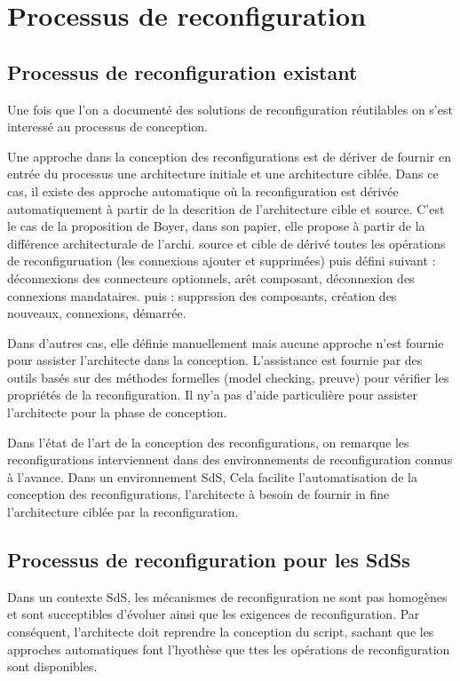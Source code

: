 \section{Processus de reconfiguration}

\subsection{Processus de reconfiguration existant}

Une fois que l'on a documenté des solutions de reconfiguration
réutilables on s'est interessé au processus de conception.

Une approche dans la conception des reconfigurations est de
dériver de fournir en entrée du processus une architecture initiale et
une architecture ciblée. Dans ce cas, il existe des approche
automatique où la reconfiguration est dérivée automatiquement à partir de la
descrition de l'architecture cible et source. C'est le cas de la
proposition de Boyer, dans son papier, elle propose à partir de la
différence architecturale de l'archi. source et cible de dérivé toutes
les opérations de reconfiguruation (les connexions ajouter et
supprimées) puis défini suivant : déconnexions des connecteurs
optionnels, arêt composant, déconnexion des connexions mandataires.
puis : supprssion des composants, création des nouveaux, connexions,
démarrée.   

Dans d'autres cas, elle
définie manuellement mais aucune approche n'est fournie pour assister
l'architecte dans la conception. L'assistance est fournie par des
outils basés sur des méthodes formelles (model checking, preuve) pour
vérifier les propriétés de la reconfiguration. Il ny'a pas d'aide
particulière pour assister l'architecte pour la phase de conception. 

Dans l'état de l'art de la conception des reconfigurations, on
remarque les reconfigurations interviennent dans des environnements de
reconfiguration connus à l'avance. Dans un environnement SdS,  
Cela facilite l'automatisation de la conception des reconfigurations,
l'architecte à besoin de fournir in fine l'architecture ciblée par la
reconfiguration.


\subsection{Processus de reconfiguration pour les SdSs}

Dans un contexte SdS, les mécanismes de reconfiguration ne sont pas
homogènes et sont succeptibles d'évoluer ainsi que les exigences de
reconfiguration. Par conséquent, l'architecte doit reprendre la
conception du script, sachant que les approches automatiques font
l'hyothèse que ttes les opérations de reconfiguration sont
disponibles. 

